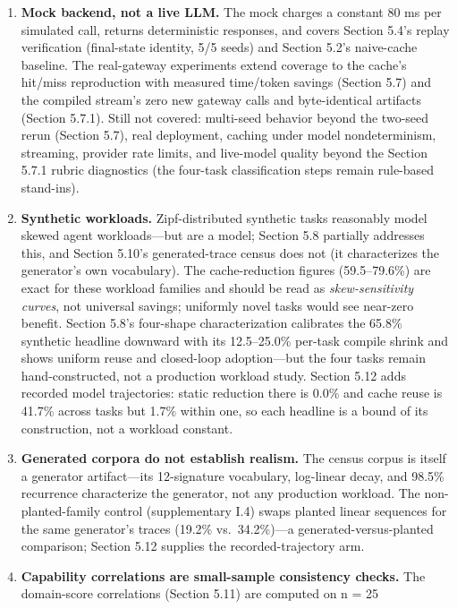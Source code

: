 \documentclass[
  sigconf,
  anonymous]{acmart}
\begin{document}
\begin{enumerate}
\def\labelenumi{\arabic{enumi}.}
\item
  \textbf{Mock backend, not a live LLM.} The mock charges a constant 80
  ms per simulated call, returns deterministic responses, and covers
  Section 5.4's replay verification (final-state identity, 5/5 seeds)
  and Section 5.2's naive-cache baseline. The real-gateway experiments
  extend coverage to the cache's hit/miss reproduction with measured
  time/token savings (Section 5.7) and the compiled stream's zero new
  gateway calls and byte-identical artifacts (Section 5.7.1). Still not
  covered: multi-seed behavior beyond the two-seed rerun (Section 5.7),
  real deployment, caching under model nondeterminism, streaming,
  provider rate limits, and live-model quality beyond the Section 5.7.1
  rubric diagnostics (the four-task classification steps remain
  rule-based stand-ins).
\item
  \textbf{Synthetic workloads.} Zipf-distributed synthetic tasks
  reasonably model skewed agent workloads---but are a model; Section 5.8
  partially addresses this, and Section 5.10's generated-trace census
  does not (it characterizes the generator's own vocabulary). The
  cache-reduction figures (59.5--79.6\%) are exact for these workload
  families and should be read as \emph{skew-sensitivity curves}, not
  universal savings; uniformly novel tasks would see near-zero benefit.
  Section 5.8's four-shape characterization calibrates the 65.8\%
  synthetic headline downward with its 12.5--25.0\% per-task compile
  shrink and shows uniform reuse and closed-loop adoption---but the four
  tasks remain hand-constructed, not a production workload study.
  Section 5.12 adds recorded model trajectories: static reduction there
  is 0.0\% and cache reuse is 41.7\% across tasks but 1.7\% within one,
  so each headline is a bound of its construction, not a workload
  constant.
\item
  \textbf{Generated corpora do not establish realism.} The census corpus
  is itself a generator artifact---its 12-signature vocabulary,
  log-linear decay, and 98.5\% recurrence characterize the generator,
  not any production workload. The non-planted-family control
  (supplementary I.4) swaps planted linear sequences for the same
  generator's traces (19.2\% vs.~34.2\%)---a generated-versus-planted
  comparison; Section 5.12 supplies the recorded-trajectory arm.
\item
  \textbf{Capability correlations are small-sample consistency checks.}
  The domain-score correlations (Section 5.11) are computed on n = 25

\end{enumerate}
\end{document}
